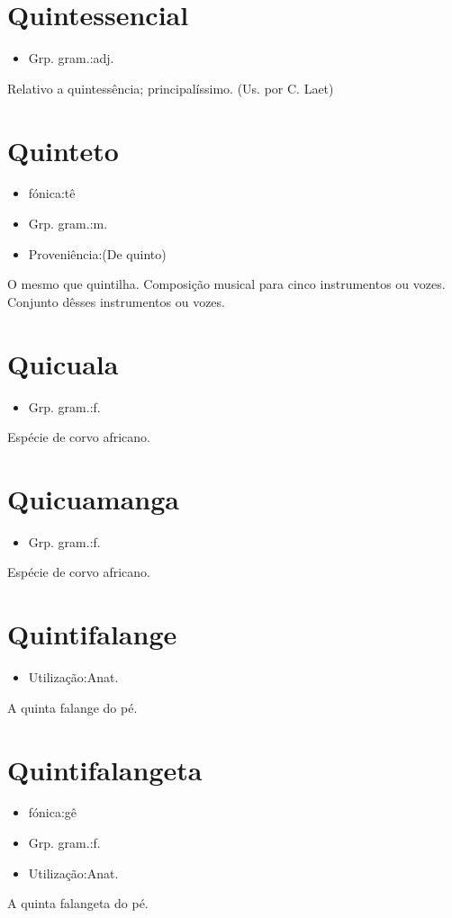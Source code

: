 \section{Quintessencial}
\begin{itemize}
\item {Grp. gram.:adj.}
\end{itemize}
Relativo a quintessência; principalíssimo. (Us. por C. Laet)
\section{Quinteto}
\begin{itemize}
\item {fónica:tê}
\end{itemize}
\begin{itemize}
\item {Grp. gram.:m.}
\end{itemize}
\begin{itemize}
\item {Proveniência:(De \textunderscore quinto\textunderscore )}
\end{itemize}
O mesmo que \textunderscore quintilha\textunderscore .
Composição musical para cinco instrumentos ou vozes.
Conjunto dêsses instrumentos ou vozes.
\section{Quicuala}
\begin{itemize}
\item {Grp. gram.:f.}
\end{itemize}
Espécie de corvo africano.
\section{Quicuamanga}
\begin{itemize}
\item {Grp. gram.:f.}
\end{itemize}
Espécie de corvo africano.
\section{Quintifalange}
\begin{itemize}
\item {Utilização:Anat.}
\end{itemize}
A quinta falange do pé.
\section{Quintifalangeta}
\begin{itemize}
\item {fónica:gê}
\end{itemize}
\begin{itemize}
\item {Grp. gram.:f.}
\end{itemize}
\begin{itemize}
\item {Utilização:Anat.}
\end{itemize}
A quinta falangeta do pé.
